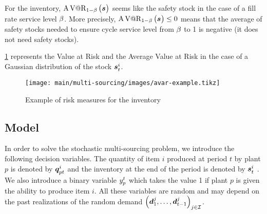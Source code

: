 For the inventory, $\AVaR_{1-\servicelvl}\bracket{\va\inventory}$ seems like the safety stock in the case of a fill rate service level $\beta$.
More precisely, $\AVaR_{1-\servicelvl}\bracket{\va\inventory}\le 0$ means that the average of safety stocks needed to ensure cycle service level from $\beta$ to 1 is negative (\ie it does not need safety stocks).


\cref{fig:avar-examples} represents the Value at Risk and the Average Value at Risk in the case of a Gaussian distribution of the stock $\va\inventory_t^i$.


\begin{figure}[h]
  \centering
  \texttt{[image: main/multi-sourcing/images/avar-example.tikz]}
  \caption{Example of risk measures for the inventory}
  \label{fig:avar-examples}
\end{figure}



\subsection{Model}


In order to solve the stochastic multi-sourcing problem, we introduce the following decision variables.
The quantity of item $i$ produced at period $t$ by plant $p$ is denoted by $\va\quantity_{pt}^i$ and the inventory at the end of the period is denoted by $\va\inventory_t^i$ .
We also introduce a binary variable $y_p^t$ which takes the value 1 if plant $p$ is given the ability to produce item $i$.
All these variables are random and may depend on the past realizations of the random demand $\bracket{\va\demand_1^j,\ldots,\va\demand_{t-1}^j}_{j\in\REF}$.


